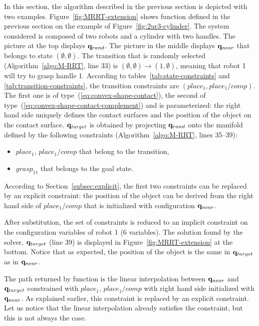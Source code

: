 In this section, the algorithm described in the previous section is depicted with two examples. Figure~\ref{fig:MRRT-extension} shows function \EXTEND defined in the previous section on the example of Figure~\ref{fig:2ur3-cylinder}.
The system considered is
composed of two robots and a cylinder with two handles. The picture at the top displays
$\mathbf{q}_{rand}$. The picture in the middle displays $\mathbf{q}_{near}$ that belongs to state
$(\emptyset,\emptyset)$. The transition that is randomly selected
(Algorithm~\ref{algo:M-RRT}, line 33) is
$(\emptyset,\emptyset) \rightarrow (1,\emptyset)$, meaning that robot 1 will
try to grasp handle 1. According to tables~\ref{tab:state-constraints} and
\ref{tab:transition-constraints}, the transition constraints are
$(place_1, place_1/comp)$.
The first one is of type~(\ref{eq:convex-shape-contact}), the second
of type~(\ref{eq:convex-shape-contact-complement}) and is parameterized: the
right hand side uniquely defines the contact surfaces and the position of the
object on the contact surface. $\mathbf{q}_{target}$ is obtained by projecting $\mathbf{q}_{rand}$
onto the manifold defined by the following constraints
(Algorithm~\ref{algo:M-RRT}, lines 35--39):
\begin{itemize}
\item $place_1$, $place_1/comp$ that belong to the transition,
\item $grasp_{11}$ that belongs to the goal state.
\end{itemize}
According to Section~\ref{subsec:explicit}, the first two constraints can be
replaced by an explicit constraint: the position of the object can be derived
from the right hand side of $place_1/comp$ that is initialized with configuration
$\mathbf{q}_{near}$.

After substitution, the set of constraints is reduced to an implicit constraint
on the configuration variables of robot 1 (6 variables). The solution found by the solver, $\mathbf{q}_{target}$ (line 39) is displayed in
Figure~\ref{fig:MRRT-extension} at the bottom. Notice that as expected, the position of the object is the same in $\mathbf{q}_{target}$ as in $\mathbf{q}_{near}$.

The path returned by function \EXTEND is the linear interpolation between
$\mathbf{q}_{near}$ and $\mathbf{q}_{target}$ constrained with $place_1$, $place_1/comp$ with
right hand side initialized with $\mathbf{q}_{near}$. As explained earlier, this
constraint is replaced by an explicit constraint. Let us notice that the linear interpolation already satisfies the constraint, but this is not always the case.

